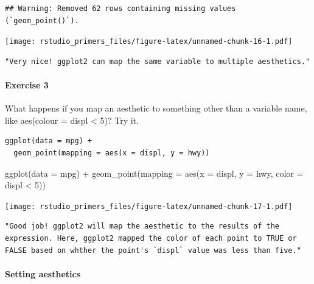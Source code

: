 \documentclass[
]{article}
\newenvironment{Shaded}{\begin{snugshade}}{\end{snugshade}}
\newcommand{\AttributeTok}[1]{\textcolor[rgb]{0.77,0.63,0.00}{#1}}
\newcommand{\DecValTok}[1]{\textcolor[rgb]{0.00,0.00,0.81}{#1}}
\newcommand{\FunctionTok}[1]{\textcolor[rgb]{0.00,0.00,0.00}{#1}}
\newcommand{\NormalTok}[1]{#1}
\newcommand{\SpecialCharTok}[1]{\textcolor[rgb]{0.00,0.00,0.00}{#1}}
\begin{document}
\begin{verbatim}
## Warning: Removed 62 rows containing missing values (`geom_point()`).
\end{verbatim}

\texttt{[image: rstudio\_primers\_files/figure-latex/unnamed-chunk-16-1.pdf]}

\begin{verbatim}
"Very nice! ggplot2 can map the same variable to multiple aesthetics."
\end{verbatim}

\hypertarget{exercise-3-1}{%
\paragraph{Exercise 3}\label{exercise-3-1}}

What happens if you map an aesthetic to something other than a variable
name, like aes(colour = displ \textless{} 5)? Try it.

\begin{verbatim}
ggplot(data = mpg) + 
  geom_point(mapping = aes(x = displ, y = hwy))
\end{verbatim}

\begin{Shaded}
\begin{Highlighting}[]
\FunctionTok{ggplot}\NormalTok{(}\AttributeTok{data =}\NormalTok{ mpg) }\SpecialCharTok{+} 
  \FunctionTok{geom\_point}\NormalTok{(}\AttributeTok{mapping =} \FunctionTok{aes}\NormalTok{(}\AttributeTok{x =}\NormalTok{ displ, }\AttributeTok{y =}\NormalTok{ hwy, }\AttributeTok{color =}\NormalTok{ displ }\SpecialCharTok{\textless{}} \DecValTok{5}\NormalTok{))}
\end{Highlighting}
\end{Shaded}

\texttt{[image: rstudio\_primers\_files/figure-latex/unnamed-chunk-17-1.pdf]}

\begin{verbatim}
"Good job! ggplot2 will map the aesthetic to the results of the expression. Here, ggplot2 mapped the color of each point to TRUE or FALSE based on whther the point's `displ` value was less than five."
\end{verbatim}

\hypertarget{setting-aesthetics}{%
\paragraph{Setting aesthetics}\label{setting-aesthetics}}
\end{document}
